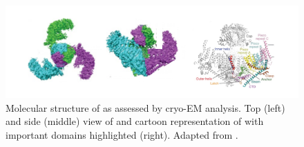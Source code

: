 \subsection{\Piezo{}}

\begin{figure}
	\centering
	\includegraphics[width=0.9\linewidth]{PiezoMolecule.png}
	\caption{Molecular structure of \Piezo{} as assessed by cryo-EM analysis. Top (left) and side (middle) view of \Piezo{} and cartoon representation of \Piezo{} with important domains highlighted (right). Adapted from \cite{Saotome2018, Zhao2018}.}
	\label{pic:Piezo}
\end{figure}


